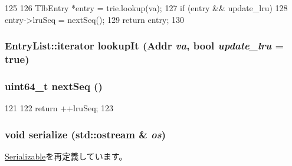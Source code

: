 \begin{DoxyCode}
125 {
126     TlbEntry *entry = trie.lookup(va);
127     if (entry && update_lru)
128         entry->lruSeq = nextSeq();
129     return entry;
130 }
\end{DoxyCode}
\hypertarget{classX86ISA_1_1TLB_ae73955fcefd34a6fab596ade6c99290f}{
\subsubsection[{lookupIt}]{\setlength{\rightskip}{0pt plus 5cm}EntryList::iterator lookupIt ({\bf Addr} {\em va}, \/  bool {\em update\_\-lru} = {\ttfamily true})}}
\label{classX86ISA_1_1TLB_ae73955fcefd34a6fab596ade6c99290f}
\hypertarget{classX86ISA_1_1TLB_ab150a470cb370c561702b113ede76c7d}{
\subsubsection[{nextSeq}]{\setlength{\rightskip}{0pt plus 5cm}uint64\_\-t nextSeq ()}}
\label{classX86ISA_1_1TLB_ab150a470cb370c561702b113ede76c7d}



\begin{DoxyCode}
121         {
122             return ++lruSeq;
123         }
\end{DoxyCode}
\hypertarget{classX86ISA_1_1TLB_a53e036786d17361be4c7320d39c99b84}{
\subsubsection[{serialize}]{\setlength{\rightskip}{0pt plus 5cm}void serialize (std::ostream \& {\em os})}}
\label{classX86ISA_1_1TLB_a53e036786d17361be4c7320d39c99b84}


\hyperlink{classSerializable_ad6272f80ae37e8331e3969b3f072a801}{Serializable}を再定義しています。


